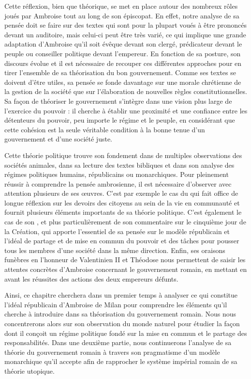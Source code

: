 Cette réflexion, bien que théorique, se met en place autour des nombreux rôles joués par Ambroise tout au long de son épiscopat. En effet, notre analyse de sa pensée doit se faire sur des textes qui sont pour la plupart voués à être prononcés devant un auditoire, mais celui-ci peut être très varié, ce qui implique une grande adaptation d'Ambroise qu'il soit évêque devant son clergé, prédicateur devant le peuple ou conseiller politique devant l'empereur. En fonction de sa posture, son discours évolue et il est nécessaire de recouper ces différentes approches pour en tirer l'ensemble de sa théorisation du bon gouvernement. Comme ses textes se doivent d'être utiles, sa pensée se fonde davantage sur une morale chrétienne de la gestion de la société que sur l'élaboration de nouvelles règles constitutionnelles. Sa façon de théoriser le gouvernement s'intègre dans une vision plus large de l'exercice du pouvoir : il cherche à établir une proximité et une confiance entre les détenteurs du pouvoir, peu importe le régime et le peuple, en considérant que cette cohésion est la seule véritable condition à la bonne tenue d'un gouvernement et d'une société juste.

\bigskip

Cette théorie politique trouve son fondement dans de multiples observations des sociétés animales, dans sa lecture des textes bibliques et dans son analyse des régimes politiques humains, républicains ou monarchiques. Pour pleinement réussir à comprendre la pensée ambrosienne, il est nécessaire d'observer avec attention plusieurs de ses œuvres. C'est par exemple le cas du  qui fait office de longue réflexion sur les devoirs des citoyens au sein de la vie en communauté et fournit plusieurs éléments importants de sa théorie politique. C'est également le cas de son , et plus particulièrement de son commentaire sur le cinquième jour de la Création, qui apporte l'essentiel de sa pensée sur le modèle républicain et l'idéal de partage et de mise en commun du pouvoir et des tâches pour pousser tous les membres d'une société dans la même direction. Enfin, ses oraisons funèbres en l'honneur de Valentinien II et Théodose nous permettent de saisir les attentes concrètes d'Ambroise concernant le gouvernement romain, en mettant en avant les réussites des actions des deux empereurs défunts.

\bigskip

Ainsi, ce chapitre cherchera dans un premier temps à analyser ce qui constitue l'idéal républicain d'Ambroise de Milan pour comprendre les éléments qu'il cherche à introduire dans sa théorisation du gouvernement romain. Nous nous concentrerons alors sur son observation du monde naturel pour étudier la façon dont il conçoit un régime politique fondé sur la mise en commun et le partage des responsabilités. Dans une deuxième partie, nous continuerons l'analyse de sa théorie du gouvernement romain à travers son pragmatisme d'un modèle monarchique qu'il accepte afin de rapprocher le système impérial romain de sa théorie utopique.

\bigskip
